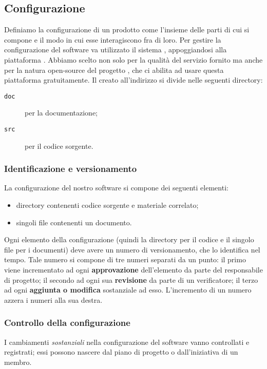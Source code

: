 \subsection{Configurazione} \label{sec:config}
Definiamo la configurazione di un prodotto come l'insieme delle parti di cui si compone e il modo in cui esse interagiscono fra di loro. Per gestire la configurazione del software va utilizzato il sistema , appoggiandosi alla piattaforma . Abbiamo scelto  non solo per la qualità del servizio fornito ma anche per la natura open-source del progetto \proj, che ci abilita ad usare questa piattaforma gratuitamente. Il  creato all'indirizzo \repo{} si divide nelle seguenti directory:
\begin{description}
	\item[\texttt{doc}] per la documentazione;
	\item[\texttt{src}] per il codice sorgente.
\end{description}

\subsubsection{Identificazione e versionamento} \label{sec:idvers}
La configurazione del nostro software si compone dei seguenti elementi:
\begin{itemize}
	\item directory contenenti codice sorgente e materiale correlato;
	\item singoli file contenenti un documento.
\end{itemize}
Ogni elemento della configurazione (quindi la directory per il codice e il singolo file per i documenti) deve avere un numero di versionamento, che lo identifica nel tempo. Tale numero si compone di tre numeri separati da un punto: il primo viene incrementato ad ogni \textbf{approvazione} dell'elemento da parte del responsabile di progetto; il secondo ad ogni sua \textbf{revisione} da parte di un verificatore; il terzo ad ogni \textbf{aggiunta o modifica} sostanziale ad esso. L'incremento di un numero azzera i numeri alla sua destra.

\subsubsection{Controllo della configurazione} I cambiamenti \emph{sostanziali} nella configurazione del software vanno controllati e registrati; essi possono nascere dal piano di progetto o dall'iniziativa di un membro.
